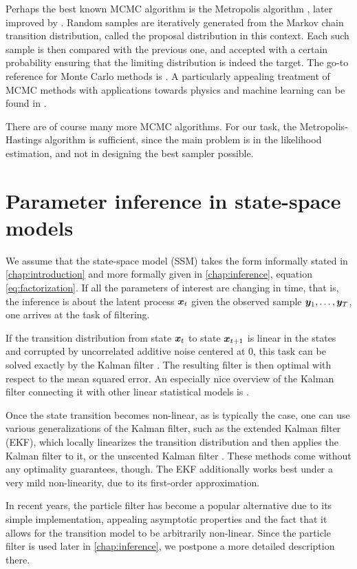 Perhaps the best known MCMC algorithm is the Metropolis algorithm \citep{metropolis}, later improved by \cite{hastings}. Random samples are iteratively generated from the Markov chain transition distribution, called the proposal distribution in this context. Each such sample is then compared with the previous one, and accepted with a certain probability ensuring that the limiting distribution is indeed the target. The go-to reference for Monte Carlo methods is \cite{robert-casella}. A particularly appealing treatment of MCMC methods with applications towards physics and machine learning can be found in \cite{information-theory}.

There are of course many more MCMC algorithms. For our task, the Metropolis-Hastings algorithm is sufficient, since the main problem is in the likelihood estimation, and not in designing the best sampler possible.

\section{Parameter inference in state-space models}
We assume that the state-space model (SSM) takes the form informally stated in \autoref{chap:introduction} and more formally given in \autoref{chap:inference}, equation \eqref{eq:factorization}. If all the parameters of interest are changing in time, that is, the inference is about the latent process $\bm{x}_t$ given the observed sample $\bm{y}_1, \ldots, \bm{y}_T$, one arrives at the task of filtering.

If the transition distribution from state $\bm{x}_t$ to state $\bm{x}_{t+1}$ is linear in the states and corrupted by uncorrelated additive noise centered at 0, this task can be solved exactly by the Kalman filter \citep{kalman}. The resulting filter is then optimal with respect to the mean squared error. An especially nice overview of the Kalman filter connecting it with other linear statistical models is \cite{lds}.

Once the state transition becomes non-linear, as is typically the case, one can use various generalizations of the Kalman filter, such as the extended Kalman filter (EKF), which locally linearizes the transition distribution and then applies the Kalman filter to it, or the unscented Kalman filter \citep{ukf}. These methods come without any optimality guarantees, though. The EKF additionally works best under a very mild non-linearity, due to its first-order approximation.

In recent years, the particle filter \citep{particle-filter} has become a popular alternative due to its simple implementation, appealing asymptotic properties and the fact that it allows for the transition model to be arbitrarily non-linear. Since the particle filter is used later in \autoref{chap:inference}, we postpone a more detailed description there.

